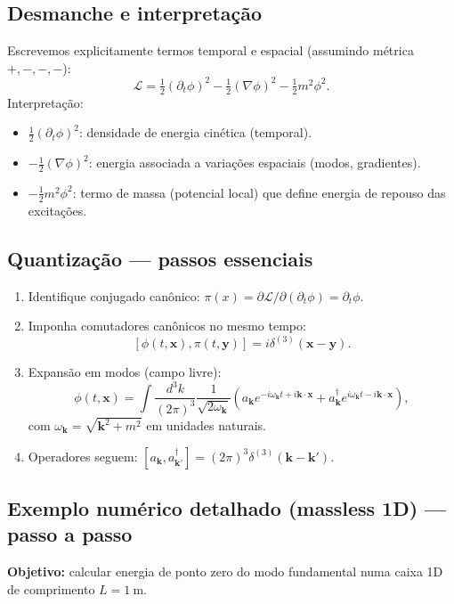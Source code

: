 \documentclass[12pt,a4paper]{article}
\begin{document}
\subsection{Desmanche e interpretação}
Escrevemos explicitamente termos temporal e espacial (assumindo métrica $+,-,-,-$):
\begin{equation}
\mathcal{L} = \tfrac{1}{2}(\partial_t\phi)^2 - \tfrac{1}{2}(\nabla\phi)^2 - \tfrac{1}{2} m^2\phi^2.
\end{equation}
Interpretação:
\begin{itemize}
  \item $\tfrac{1}{2}(\partial_t\phi)^2$: densidade de energia cinética (temporal).
  \item $-\tfrac{1}{2}(\nabla\phi)^2$: energia associada a variações espaciais (modos, gradientes).
  \item $-\tfrac{1}{2}m^2\phi^2$: termo de massa (potencial local) que define energia de repouso das excitações.
\end{itemize}

\subsection{Quantização — passos essenciais}
\begin{enumerate}
  \item Identifique conjugado canônico: $\pi(x) = \partial \mathcal{L}/\partial(\partial_t\phi) = \partial_t\phi$.
  \item Imponha comutadores canônicos no mesmo tempo:
  \[ [\phi(t,\mathbf{x}),\pi(t,\mathbf{y})] = i\delta^{(3)}(\mathbf{x}-\mathbf{y}). \]
  \item Expansão em modos (campo livre):
  \begin{equation}\label{phi_modes}
  \phi(t,\mathbf{x}) = \int\frac{d^3k}{(2\pi)^3}\frac{1}{\sqrt{2\omega_{\mathbf{k}}}}\left(a_{\mathbf{k}}e^{-i\omega_{\mathbf{k}}t+i\mathbf{k}\cdot\mathbf{x}}+a^\dagger_{\mathbf{k}}e^{i\omega_{\mathbf{k}}t-i\mathbf{k}\cdot\mathbf{x}}\right),
  \end{equation}
  com $\omega_{\mathbf{k}}=\sqrt{\mathbf{k}^2+m^2}$ em unidades naturais.
  \item Operadores seguem: $[a_{\mathbf{k}},a^\dagger_{\mathbf{k}'}]=(2\pi)^3\delta^{(3)}(\mathbf{k}-\mathbf{k}')$.
\end{enumerate}

\subsection{Exemplo numérico detalhado (massless 1D) — passo a passo}
\textbf{Objetivo:} calcular energia de ponto zero do modo fundamental numa caixa 1D de comprimento $L=1\ \mathrm{m}$.
\end{document}
